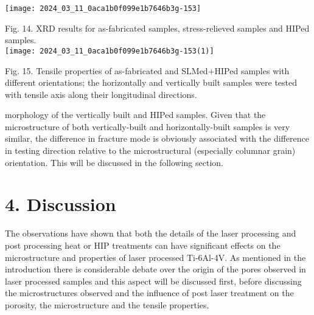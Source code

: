 \documentclass[10pt]{article}
\begin{document}
\begin{center}
\texttt{[image: 2024\_03\_11\_0aca1b0f099e1b7646b3g-153]}
\end{center}

Fig. 14. XRD results for as-fabricated samples, stress-relieved samples and HIPed samples.\\
\texttt{[image: 2024\_03\_11\_0aca1b0f099e1b7646b3g-153(1)]}

Fig. 15. Tensile properties of as-fabricated and SLMed+HIPed samples with different orientations; the horizontally and vertically built samples were tested with tensile axis along their longitudinal directions.

morphology of the vertically built and HIPed samples. Given that the microstructure of both vertically-built and horizontally-built samples is very similar, the difference in fracture mode is obviously associated with the difference in testing direction relative to the microstructural (especially columnar grain) orientation. This will be discussed in the following section.

\section*{4. Discussion}
The observations have shown that both the details of the laser processing and post processing heat or HIP treatments can have significant effects on the microstructure and properties of laser processed Ti-6Al-4V. As mentioned in the introduction there is considerable debate over the origin of the pores observed in laser processed samples and this aspect will be discussed first, before discussing the microstructures observed and the influence of post laser treatment on the porosity, the microstructure and the tensile properties.
\end{document}
